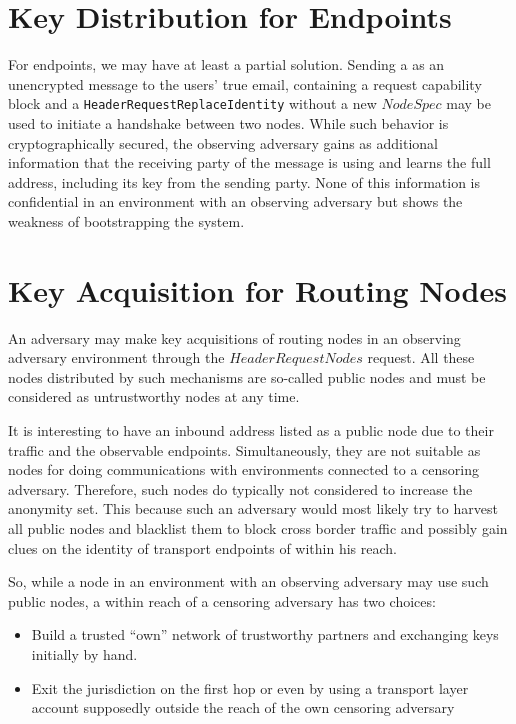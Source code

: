 \section{Key Distribution for Endpoints}
For endpoints, we may have at least a partial solution. Sending a \VortexMessage{} as an unencrypted message to the users' true email, containing a request capability block and a \texttt{HeaderRequestReplaceIdentity} without a new $NodeSpec$ may be used to initiate a handshake between two nodes. While such behavior is cryptographically secured, the observing adversary gains as additional information that the receiving party of the message is using \MessageVortex{} and learns the full address, including its key from the sending party. None of this information is confidential in an environment with an observing adversary but shows the weakness of bootstrapping the system.

\section{Key Acquisition for Routing Nodes}
An adversary may make key acquisitions of routing nodes in an observing adversary environment through the $HeaderRequestNodes$ request. All these nodes distributed by such mechanisms are so-called public nodes and must be considered as untrustworthy nodes at any time. 

It is interesting to have an inbound address listed as a public node due to their traffic and the observable endpoints. Simultaneously, they are not suitable as nodes for doing communications with environments connected to a censoring adversary. Therefore, such nodes do typically not considered to increase the anonymity set. This because such an adversary would most likely try to harvest all public nodes and blacklist them to block cross border traffic and possibly gain clues on the identity of transport endpoints of \VortexNodes{} within his reach.

So, while a node in an environment with an observing adversary may use such public nodes, a \VortexNode{} within reach of a censoring adversary has two choices:
\begin{itemize}
	\item Build a trusted ``own'' network of trustworthy partners and exchanging keys initially by hand.
	\item Exit the jurisdiction on the first hop or even by using a transport layer account supposedly outside the reach of the own censoring adversary
\end{itemize}

